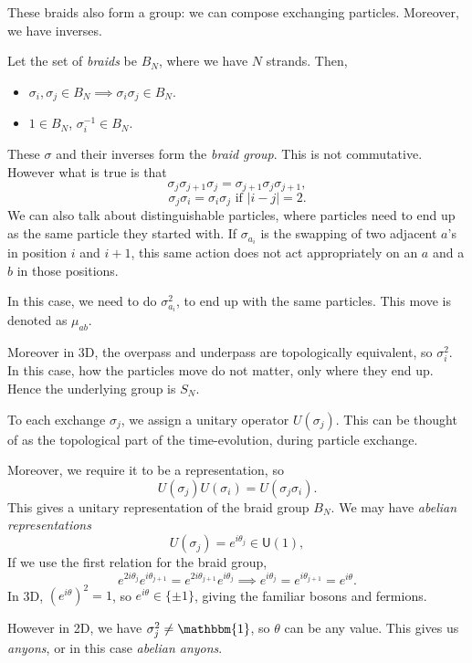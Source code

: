 \documentclass[12pt]{article}
\begin{document}
These braids also form a group: we can compose exchanging particles. Moreover, we have inverses.

Let the set of \emph{braids} be $B_N$, where we have $N$ strands. Then,
\begin{itemize}
	\item $\sigma_i, \sigma_j \in B_N \implies \sigma_i \sigma_j \in B_N$.
	\item $1 \in B_N$, $\sigma_i^{-1} \in B_N$.
\end{itemize}

These $\sigma$ and their inverses form the \emph{braid group}. This is not commutative. However what is true is that
\[
\sigma_j \sigma_{j+1} \sigma_j = \sigma_{j+1} \sigma_j \sigma_{j+1},
\]
\[
	\sigma_j \sigma_i = \sigma_i \sigma_j \text{ if } |i - j| = 2.
\]
We can also talk about distinguishable particles, where particles need to end up as the same particle they started with. If $\sigma_{a_i}$ is the swapping of two adjacent $a$'s in position $i$ and $i + 1$, this same action does not act appropriately on an $a$ and a $b$ in those positions.

In this case, we need to do $\sigma_{a_i}^2$, to end up with the same particles. This move is denoted as $\mu_{ab}$.

Moreover in 3D, the overpass and underpass are topologically equivalent, so $\sigma_i^2$. In this case, how the particles move do not matter, only where they end up. Hence the underlying group is $S_N$.

To each exchange $\sigma_j$, we assign a unitary operator $U(\sigma_j)$. This can be thought of as the topological part of the time-evolution, during particle exchange.

Moreover, we require it to be a representation, so
\[
U(\sigma_j) U(\sigma_i) = U(\sigma_j \sigma_i).
\]
This gives a unitary representation of the braid group $B_N$. We may have \emph{abelian representations}
\[
U(\sigma_j) = e^{i \theta_j} \in \mathsf{U}(1),
\]
If we use the first relation for the braid group,
\[
e^{2i \theta_j} e^{i \theta_{j+1}} =  e^{2i \theta_{j+1}} e^{i \theta_j} \implies e^{i\theta_j} = e^{i \theta_{j+1}} = e^{i\theta}.
\]
In 3D, $(e^{i\theta})^2 = 1$, so $e^{i\theta} \in \{\pm 1\}$, giving the familiar bosons and fermions.

However in 2D, we have $\sigma_j^2 \neq \mathbbm{1}$, so $\theta$ can be any value. This gives us \emph{anyons}, or in this case \emph{abelian anyons}.
\end{document}
